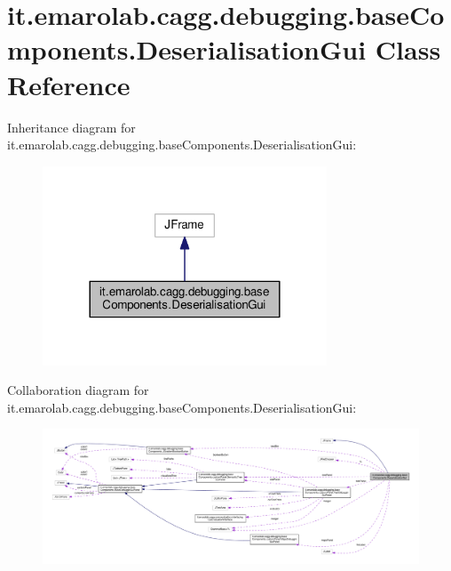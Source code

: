 \hypertarget{classit_1_1emarolab_1_1cagg_1_1debugging_1_1baseComponents_1_1DeserialisationGui}{\section{it.\-emarolab.\-cagg.\-debugging.\-base\-Components.\-Deserialisation\-Gui Class Reference}
\label{classit_1_1emarolab_1_1cagg_1_1debugging_1_1baseComponents_1_1DeserialisationGui}
}


Inheritance diagram for it.\-emarolab.\-cagg.\-debugging.\-base\-Components.\-Deserialisation\-Gui\-:\nopagebreak
\begin{figure}[H]
\begin{center}
\leavevmode
\includegraphics[width=240pt]{classit_1_1emarolab_1_1cagg_1_1debugging_1_1baseComponents_1_1DeserialisationGui__inherit__graph}
\end{center}
\end{figure}


Collaboration diagram for it.\-emarolab.\-cagg.\-debugging.\-base\-Components.\-Deserialisation\-Gui\-:\nopagebreak
\begin{figure}[H]
\begin{center}
\leavevmode
\includegraphics[width=350pt]{classit_1_1emarolab_1_1cagg_1_1debugging_1_1baseComponents_1_1DeserialisationGui__coll__graph}
\end{center}
\end{figure}

